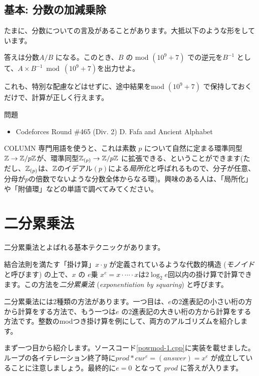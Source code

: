 \documentclass{jsarticle}
\begin{document}
  \subsection{基本: 分数の加減乗除}
  \label{subsec:operations-on-fractions}
  たまに、分数についての言及があることがあります。大抵以下のような形をしています。
  \begin{center}
   答えは分数$A/B$ になる。このとき、$B$ の mod $(10^9+7)$ での逆元を$B^{-1}$ として、$A \times B^{-1} \bmod (10^9 + 7)$を出力せよ。
  \end{center}
  これも、特別な配慮などはせずに、途中結果をmod $(10^9+7)$ で保持しておくだけで、計算が正しく行えます。
  \begin{itembox}[l]{問題}
   \begin{itemize}
    \item Codeforces Round \#465 (Div. 2) D. Fafa and Ancient Alphabet
   \end{itemize}
  \end{itembox}
  \begin{itembox}[l]{COLUMN}
   専門用語を使うと、これは素数 $p$ について自然に定まる環準同型$\mathbb{Z} \to \mathbb{Z}/p\mathbb{Z}$が、環準同型$\mathbb{Z}_{(p)} \to \mathbb{Z}/p\mathbb{Z}$ に拡張できる、ということができます(ただし、$\mathbb{Z}_{(p)}$は、$\mathbb{Z}$のイデアル$(p)$による\emph{局所化}と呼ばれるもので、分子が任意、分母が$p$の倍数でないような分数全体からなる環)。興味のある人は、「局所化」や「附値環」などの単語で調べてみてください。
  \end{itembox}
 \section{二分累乗法}
 \label{sec:exponentiation-by-squaring}
 二分累乗法とよばれる基本テクニックがあります。

 結合法則を満たす「掛け算」$x \cdot y$ が定義されているような代数的構造 (\emph{モノイド}と呼びます) の上で、$x$ の $e$乗 $x^e = x \cdot \cdots \cdot x$は$2\log_2 e$回以内の掛け算で計算できます。この方法を\emph{二分累乗法} (\emph{exponentiation by squaring}) と呼びます。

 二分累乗法には2種類の方法があります。一つ目は、$e$の2進表記の小さい桁の方から計算をする方法で、もう一つは$e$ の2進表記の大きい桁の方から計算をする方法です。整数のmodつき掛け算を例にして、両方のアルゴリズムを紹介します。

 まず一つ目から紹介します。ソースコード\ref{powmod-1.cpp}に実装を載せました。
 ループの各イテレーション終了時に$prod * cur^e = (answer) = x^e$ が成立していることに注意しましょう。最終的に$e = 0$ となって $prod$ に答えが入ります。
 
\end{document}

